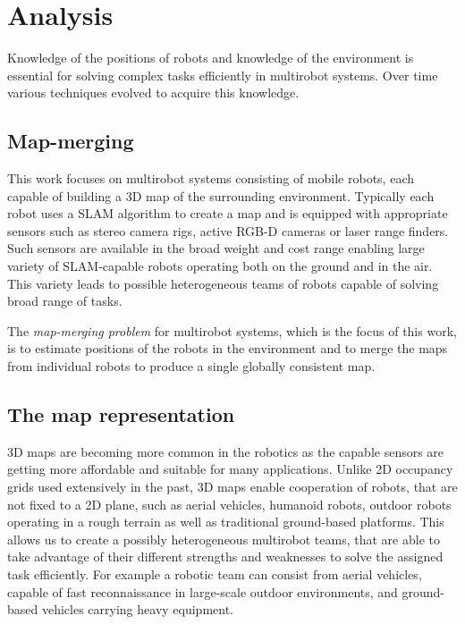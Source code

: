 \chapter{Analysis}
\label{chap:analysis}

Knowledge of the positions of robots and knowledge of the environment is essential for solving complex tasks efficiently in multirobot systems. Over time various techniques evolved to acquire this knowledge.

\section{Map-merging}

This work focuses on multirobot systems consisting of mobile robots, each capable of building a \gls{3D} map of the surrounding environment. Typically each robot uses a \gls{SLAM} algorithm to create a map and is equipped with appropriate sensors such as stereo camera rigs, active \gls{RGB-D} cameras or laser range finders. Such sensors are available in the broad weight and cost range enabling large variety of \gls{SLAM}-capable robots operating both on the ground and in the air. This variety leads to possible heterogeneous teams of robots capable of solving broad range of tasks.

The \textit{map-merging problem} for multirobot systems, which is the focus of this work, is to estimate positions of the robots in the environment and to merge the maps from individual robots to produce a single globally consistent map.

\section{The map representation}

\Gls{3D} maps are becoming more common in the robotics as the capable sensors are getting more affordable and suitable for many applications. Unlike \gls{2D} occupancy grids used extensively in the past, \gls{3D} maps enable cooperation of robots, that are not fixed to a \gls{2D} plane, such as aerial vehicles, humanoid robots, outdoor robots operating in a rough terrain as well as traditional ground-based platforms. This allows us to create a possibly heterogeneous multirobot teams, that are able to take advantage of their different strengths and weaknesses to solve the assigned task efficiently. For example a robotic team can consist from aerial vehicles, capable of fast reconnaissance in large-scale outdoor environments, and ground-based vehicles carrying heavy equipment.

